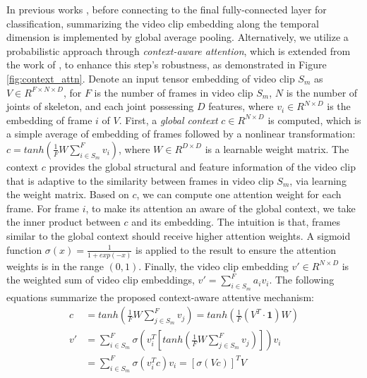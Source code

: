 \documentclass[letterpaper]{article} %
\begin{document}
In previous works \cite{yan2018spatial, 2sagcn2019cvpr}, before connecting to the final fully-connected layer for classification, summarizing the video clip embedding along the temporal dimension is implemented by global average pooling. Alternatively, we utilize a probabilistic approach through \textit{context-aware attention}, which is extended from the work of \cite{simgnn2019}, to enhance this step's robustness, as demonstrated in Figure \ref{fig:context_attn}. Denote an input tensor embedding of video clip $S_m$ as $V \in R^{F \times N \times D}$, for $F$ is the number of frames in video clip $S_m$, $N$ is the number of joints of skeleton, and each joint possessing $D$ features, where $v_i \in R^{N \times D}$ is the embedding of frame $i$ of $V$. First, a \textit{global context} $c \in R^{N \times D}$ is computed, which is a simple average of embedding of frames followed by a nonlinear transformation: $c = tanh \left(\frac{1}{F} W \sum^{F}_{i \in S_m} v_i \right)$, where $W \in R^{D \times D}$ is a learnable weight matrix. The context $c$ provides the global structural and feature information of the video clip that is adaptive to the similarity between frames in video clip $S_m$, via learning the weight matrix. Based on $c$, we can compute one attention weight for each frame. For frame $i$, to make its attention an aware of the global context, we take the inner product between $c$ and its embedding. The intuition is that, frames similar to the global context should receive higher attention weights. A sigmoid function $\sigma(x) = \frac{1}{1 + exp(-x)}$ is applied to the result to ensure the attention weights is in the range $(0, 1)$. Finally, the video clip embedding $v' \in R^{N \times D}$ is the weighted sum of video clip embeddings, $v' = \sum^{F}_{i \in S_m} a_i v_i$. The following equations summarize the proposed context-aware attentive mechanism:
\begin{equation}
    \begin{split}
        c &= tanh \left( \frac{1}{F} W \sum^{F}_{j \in S_{m}} v_j \right) = tanh \left( \frac{1}{F} \left( V^T \cdot \mathbf{1} \right) W \right) \\
    v' &= \sum^{F}_{i \in S_m} \sigma \left( v_i^{T} \left[ tanh \left(
\frac{1}{F} W \sum^{F}_{j \in S_{m}} v_j \right) \right] \right) v_i \\
      &= \sum^{F}_{i \in S_{m}} \sigma \left( v_i^{T} c \right) v_i = \left[ \sigma (V c) \right]^T V    
    \end{split}
\end{equation}
\end{document}

